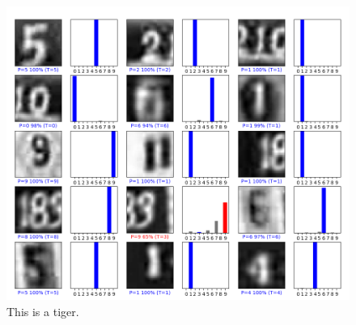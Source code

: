 \documentclass{article}
\begin{document}
\begin{figure}[h]
  \includegraphics[width=\textwidth]{results.png}
  \caption{This is a tiger.}
\end{figure}

\pagebreak
\newpage
\clearpage
\end{document}
